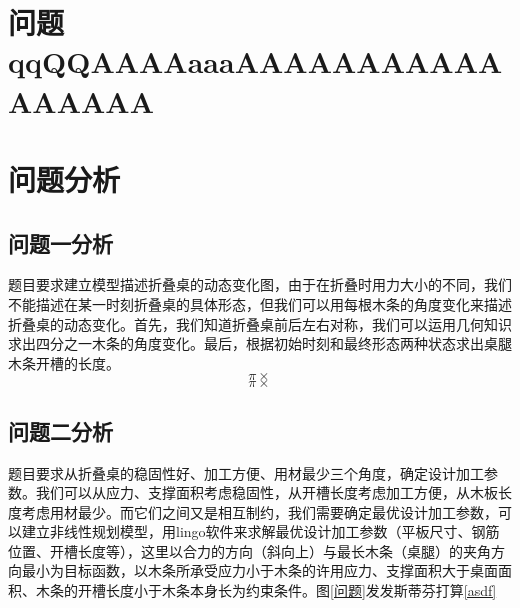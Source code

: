 \documentclass[bwprint]{gmcmthesis}
\begin{document}


\section{问题qqQQAAAAaaaAAAAAAAAAAAAAAAAA}
\section{问题分析}

\subsection{问题一分析}
题目要求建立模型描述折叠桌的动态变化图，由于在折叠时用力大小的不同，我们不能描述在某一时刻折叠桌的具体形态，但我们可以用每根木条的角度变化来描述折叠桌的动态变化。首先，我们知道折叠桌前后左右对称，我们可以运用几何知识求出四分之一木条的角度变化。最后，根据初始时刻和最终形态两种状态求出桌腿木条开槽的长度。
$$\pi\times$$
\begin{equation}
\pi\times
\end{equation}


\subsection{问题二分析}
题目要求从折叠桌的稳固性好、加工方便、用材最少三个角度，确定设计加工参数。我们可以从应力、支撑面积考虑稳固性，从开槽长度考虑加工方便，从木板长度考虑用材最少。而它们之间又是相互制约，我们需要确定最优设计加工参数，可以建立非线性规划模型，用lingo软件来求解最优设计加工参数（平板尺寸、钢筋位置、开槽长度等），这里以合力的方向（斜向上）与最长木条（桌腿）的夹角方向最小为目标函数，以木条所承受应力小于木条的许用应力、支撑面积大于桌面面积、木条的开槽长度小于木条本身长为约束条件。图\ref{问题}发发斯蒂芬打算\ref{asdf}
\end{document}
